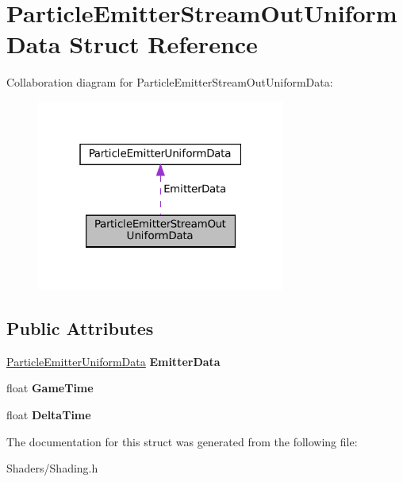 \hypertarget{structParticleEmitterStreamOutUniformData}{}\section{Particle\+Emitter\+Stream\+Out\+Uniform\+Data Struct Reference}
\label{structParticleEmitterStreamOutUniformData}


Collaboration diagram for Particle\+Emitter\+Stream\+Out\+Uniform\+Data\+:\nopagebreak
\begin{figure}[H]
\begin{center}
\leavevmode
\includegraphics[width=232pt]{structParticleEmitterStreamOutUniformData__coll__graph}
\end{center}
\end{figure}
\subsection*{Public Attributes}
\begin{DoxyCompactItemize}
\item 
\mbox{\label{structParticleEmitterStreamOutUniformData_a3525510033451af89910571399e8c440}} 
\hyperlink{structParticleEmitterUniformData}{Particle\+Emitter\+Uniform\+Data} {\bfseries Emitter\+Data}
\item 
\mbox{\label{structParticleEmitterStreamOutUniformData_a8c21ebe319650125eb50d21c4b361338}} 
float {\bfseries Game\+Time}
\item 
\mbox{\label{structParticleEmitterStreamOutUniformData_a31eb5f2800c7d480658247e34490d791}} 
float {\bfseries Delta\+Time}
\end{DoxyCompactItemize}


The documentation for this struct was generated from the following file\+:\begin{DoxyCompactItemize}
\item 
Shaders/Shading.\+h\end{DoxyCompactItemize}
